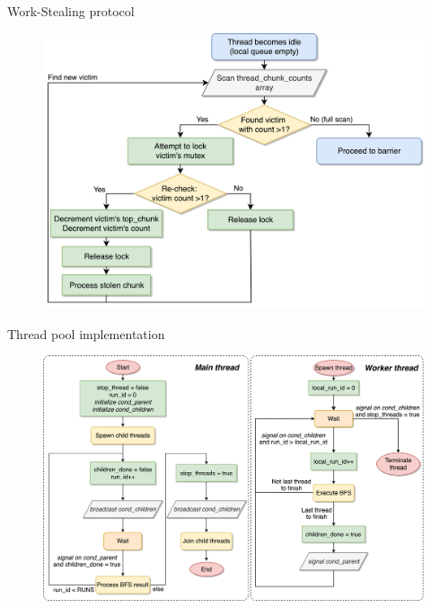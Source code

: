 \begin{specialframe}{Work-Stealing protocol}
\begin{figure}
\centering
\includegraphics[width=0.7\linewidth]{images/workstealing.png}
\end{figure}
\end{specialframe}

\begin{specialframe}{Thread pool implementation}
\begin{figure}
\centering
\includegraphics[width=0.7\linewidth]{images/threads.png}
\end{figure}
\end{specialframe}